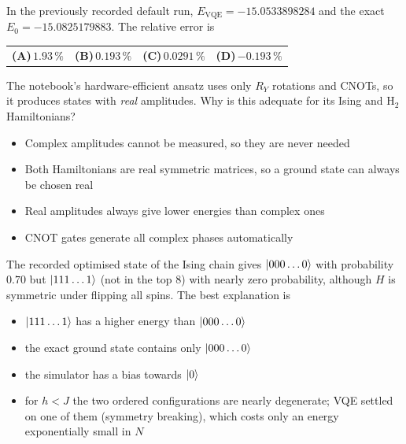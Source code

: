 \documentclass[11pt,a4paper]{article}
\newcommand{\optlabel}[1]{\textbf{(#1)}}
\newenvironment{qitem}[1]{\begin{list}{}{\setlength{\leftmargin}{3.3em}\setlength{\labelwidth}{3.1em}%
  \setlength{\labelsep}{0.2em}\setlength{\topsep}{3pt}\setlength{\parsep}{3pt}}\item[\textbf{Q.#1}\hfill]}{\end{list}}
\newcommand{\qsep}{\par\vspace{2pt}{\color{black!15}\hrule}\vspace{4pt}}
\begin{document}
\begin{qitem}{55}
In the previously recorded default run, $E_{\mathrm{VQE}} = -15.0533898284$ and the exact $E_0 = -15.0825179883$. The relative error is
\par\smallskip\noindent\begin{tabularx}{\linewidth}{@{}*{4}{L}@{}}
\optlabel{A}\,$1.93\,\%$ & \optlabel{B}\,$0.193\,\%$ & \optlabel{C}\,$0.0291\,\%$ & \optlabel{D}\,$-0.193\,\%$
\end{tabularx}
\end{qitem}
\qsep

\begin{qitem}{56}
The notebook's hardware-efficient ansatz uses only $R_Y$ rotations and CNOTs, so it produces states with \emph{real} amplitudes. Why is this
adequate for its Ising and H$_2$ Hamiltonians?
\begin{itemize}[leftmargin=2.6em, labelsep=0.4em, itemsep=2pt, topsep=3pt]
\item[\optlabel{A}] Complex amplitudes cannot be measured, so they are never needed
\item[\optlabel{B}] Both Hamiltonians are real symmetric matrices, so a ground state can always be chosen real
\item[\optlabel{C}] Real amplitudes always give lower energies than complex ones
\item[\optlabel{D}] CNOT gates generate all complex phases automatically
\end{itemize}
\end{qitem}
\qsep

\begin{qitem}{57}
The recorded optimised state of the Ising chain gives $\ket{000\dots0}$ with probability $0.70$ but $\ket{111\dots1}$ (not in the top 8) with nearly zero
probability, although $H$ is symmetric under flipping all spins. The best explanation is
\begin{itemize}[leftmargin=2.6em, labelsep=0.4em, itemsep=2pt, topsep=3pt]
\item[\optlabel{A}] $\ket{111\dots1}$ has a higher energy than $\ket{000\dots0}$
\item[\optlabel{B}] the exact ground state contains only $\ket{000\dots0}$
\item[\optlabel{C}] the simulator has a bias towards $\ket0$
\item[\optlabel{D}] for $h < J$ the two ordered configurations are nearly degenerate; VQE settled on one of them (symmetry breaking), which costs only an energy exponentially small in $N$
\end{itemize}
\end{qitem}
\qsep
\end{document}
